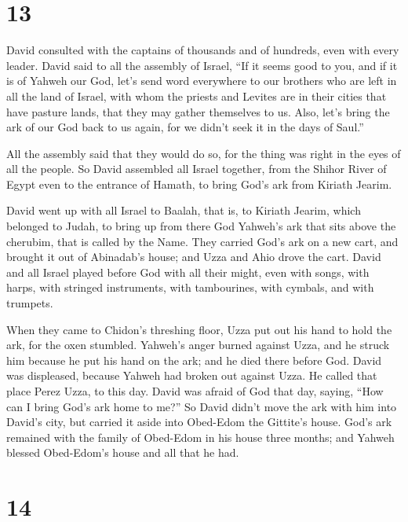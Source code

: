 \hypertarget{section-12}{%
\section{13}\label{section-12}}

 David consulted with the captains of thousands and of
hundreds, even with every leader.  David said to all the
assembly of Israel, ``If it seems good to you, and if it is of Yahweh
our God, let's send word everywhere to our brothers who are left in all
the land of Israel, with whom the priests and Levites are in their
cities that have pasture lands, that they may gather themselves to us.
 Also, let's bring the ark of our God back to us again,
for we didn't seek it in the days of Saul.''

 All the assembly said that they would do so, for the
thing was right in the eyes of all the people.  So David
assembled all Israel together, from the Shihor River of Egypt even to
the entrance of Hamath, to bring God's ark from Kiriath Jearim.

 David went up with all Israel to Baalah, that is, to
Kiriath Jearim, which belonged to Judah, to bring up from there God
Yahweh's ark that sits above the cherubim, that is called by the Name.
 They carried God's ark on a new cart, and brought it out
of Abinadab's house; and Uzza and Ahio drove the cart. 
David and all Israel played before God with all their might, even with
songs, with harps, with stringed instruments, with tambourines, with
cymbals, and with trumpets.

 When they came to Chidon's threshing floor, Uzza put out
his hand to hold the ark, for the oxen stumbled. 
Yahweh's anger burned against Uzza, and he struck him because he put his
hand on the ark; and he died there before God.  David was
displeased, because Yahweh had broken out against Uzza. He called that
place Perez Uzza, to this day.  David was afraid of God
that day, saying, ``How can I bring God's ark home to me?''
 So David didn't move the ark with him into David's city,
but carried it aside into Obed-Edom the Gittite's house. 
God's ark remained with the family of Obed-Edom in his house three
months; and Yahweh blessed Obed-Edom's house and all that he had.

\hypertarget{section-13}{%
\section{14}\label{section-13}}

